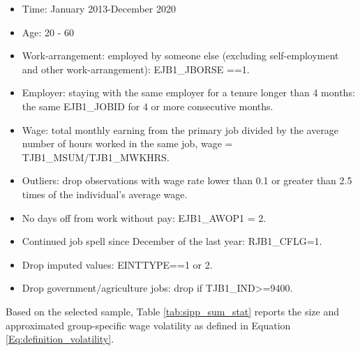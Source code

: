 \begin{itemize}
    \item Time: January 2013-December 2020
    \item Age: 20 - 60
    \item Work-arrangement: employed by someone else (excluding self-employment and other work-arrangement): EJB1\_JBORSE ==1.
    \item Employer: staying with the same employer for a tenure longer than 4 months: the same EJB1\_JOBID for  4 or more consecutive months. 
    \item Wage: total monthly earning from the primary job divided by the average number of hours worked in the same job, wage = TJB1\_MSUM/TJB1\_MWKHRS.
    \item Outliers: drop observations with wage rate lower than 0.1 or greater than 2.5 times of the individual's average wage.
    \item No days off from work without pay: EJB1\_AWOP1 = 2. 
    \item Continued job spell since December of the last year: RJB1\_CFLG=1.
    \item Drop imputed values: EINTTYPE==1 or 2.
    \item Drop government/agriculture jobs: drop if TJB1\_IND>=9400.
\end{itemize}

Based on the selected sample, Table \ref{tab:sipp_sum_stat} reports the size and approximated group-specific wage volatility as defined in Equation \ref{Eq:definition_volatility}. 

